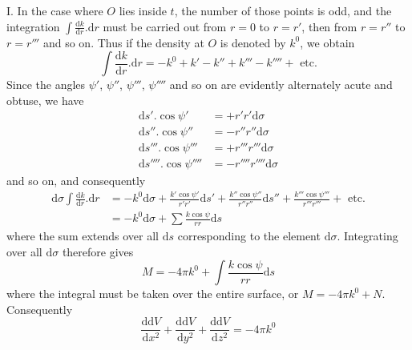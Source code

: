 I. In the case where $O$ lies inside $t$, the number of those points is odd, and the integration $\int\frac{\mathrm{d}k}{\mathrm{d}r}.\mathrm{d}r$ must be carried out from $r=0$ to $r=r'$, then from $r=r''$ to $r=r'''$ and so on. Thus if the density at $O$ is denoted by $k^0$, we obtain
\[
\int\frac{\mathrm{d}k}{\mathrm{d}r}.\mathrm{d}r=-k^0+k'-k''+k'''-k''''+\text{ etc.}
\]
Since the angles $\psi'$, $\psi''$, $\psi'''$, $\psi''''$ and so on are evidently alternately acute and obtuse, we have
\[
\begin{aligned}
\mathrm{d}s'.\cos\psi'&=+r'r'\mathrm{d}\sigma\\
\mathrm{d}s''.\cos\psi''&=-r''r''\mathrm{d}\sigma\\
\mathrm{d}s'''.\cos\psi'''&=+r'''r'''\mathrm{d}\sigma\\
\mathrm{d}s''''.\cos\psi''''&=-r''''r''''\mathrm{d}\sigma
\end{aligned}
\]
and so on, and consequently
\[
\begin{aligned}
\mathrm{d}\sigma\int\frac{\mathrm{d}k}{\mathrm{d}r}.\mathrm{d}r&=-k^0\mathrm{d}\sigma+\frac{k'\cos\psi'}{r'r'}\mathrm{d}s'+\frac{k''\cos\psi''}{r''r''}\mathrm{d}s''+\frac{k'''\cos\psi'''}{r'''r'''}+\text{ etc.}\\
&=-k^0\mathrm{d}\sigma+\sum\frac{k\cos\psi}{rr}\mathrm{d}s
\end{aligned}
\]
where the sum extends over all $\mathrm{d}s$ corresponding to the element $\mathrm{d}\sigma$. Integrating over all $\mathrm{d}\sigma$ therefore gives
\[
M=-4\pi k^0+\int\frac{k\cos\psi}{rr}\mathrm{d}s
\]
where the integral must be taken over the entire surface, or $M=-4\pi k^0+N$. Consequently
\[
\frac{\mathrm{d}\mathrm{d}V}{\mathrm{d}x^2}+\frac{\mathrm{d}\mathrm{d}V}{\mathrm{d}y^2}+\frac{\mathrm{d}\mathrm{d}V}{\mathrm{d}z^2}=-4\pi k^0
\]

